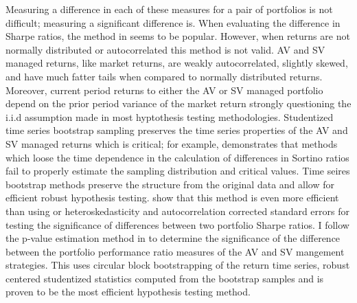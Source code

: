 Measuring a difference in each of these measures for a pair of portfolios is not difficult; measuring a significant difference is.  When evaluating the difference in Sharpe ratios, the method in \citet{memmel_performance_2003} seems to be popular. However, when returns are not normally distributed or autocorrelated this method is not valid. AV and SV managed returns, like market returns, are weakly autocorrelated, slightly skewed, and have much fatter tails when compared to normally distributed returns. Moreover, current period returns to either the AV or SV managed portfolio depend on the prior period variance of the market return strongly questioning the i.i.d assumption made in most hyptothesis testing methodologies. Studentized time series bootstrap sampling preserves the time series properties of the AV and SV managed returns which is critical; for example, \citet{scherer_alternative_2004} demonstrates that methods which loose the time dependence in the calculation of differences in Sortino ratios fail to properly estimate the sampling distribution and critical values. Time seires bootstrap methods preserve the structure from the original data and allow for efficient robust hypothesis testing. \citep{politis_stationary_1994,davison1997bootstrap} \citet{ledoit_robust_2008} show that this method is even more efficient than using \citet{newey_simple_1987} or \citet{andrews_improved_1992} heteroskedasticity and autocorrelation corrected standard errors for testing the significance of differences between two portfolio Sharpe ratios. I follow the p-value estimation method in \citet{ledoit_robust_2008} to determine the significance of the difference between the portfolio performance ratio measures of the AV and SV mangement strategies. This uses circular block bootstrapping of the return time series, robust centered studentized statistics computed from the bootstrap samples and is proven to be the most efficient hypothesis testing method. \citet{politis_general_1992,ledoit_robust_2008}

